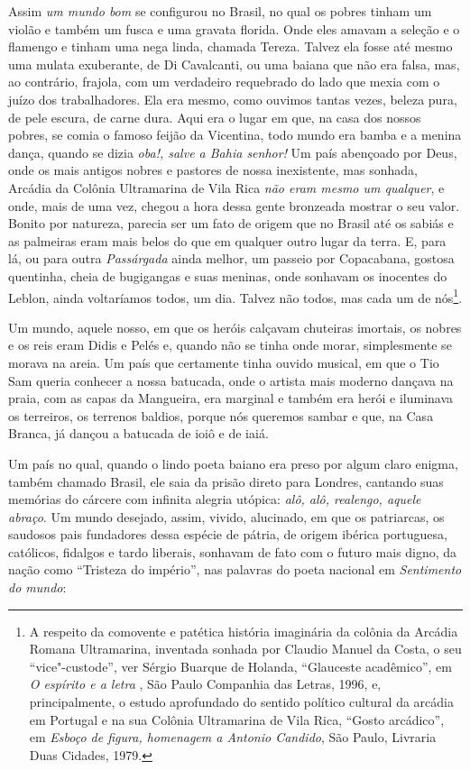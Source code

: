 Assim \emph{um mundo bom} se configurou no Brasil, no qual os pobres
tinham um violão e também um fusca e uma gravata florida. Onde eles
amavam a seleção e o flamengo e tinham uma nega linda, chamada Tereza.
Talvez ela fosse até mesmo uma mulata exuberante, de Di Cavalcanti, ou
uma baiana que não era falsa, mas, ao contrário, frajola, com um
verdadeiro requebrado do lado que mexia com o juízo dos trabalhadores.
Ela era mesmo, como ouvimos tantas vezes, beleza pura, de pele escura,
de carne dura. Aqui era o lugar em que, na casa dos nossos pobres, se
comia o famoso feijão da Vicentina, todo mundo era bamba e a menina
dança, quando se dizia \emph{oba!, salve a Bahia senhor!} Um país
abençoado por Deus, onde os mais antigos nobres e pastores de nossa
inexistente, mas sonhada, Arcádia da Colônia Ultramarina de Vila Rica
\emph{não eram mesmo um qualquer}, e onde, mais de uma vez, chegou a
hora dessa gente bronzeada mostrar o seu valor. Bonito por natureza,
parecia ser um fato de origem que no Brasil até os sabiás e as palmeiras
eram mais belos do que em qualquer outro lugar da terra. E, para lá, ou
para outra \emph{Passárgada} ainda melhor, um passeio por Copacabana,
gostosa quentinha, cheia de bugigangas e suas meninas, onde sonhavam os
inocentes do Leblon, ainda voltaríamos todos, um dia. Talvez não todos,
mas cada um de nós\footnote{A respeito da comovente e patética história
  imaginária da colônia da Arcádia Romana Ultramarina, inventada sonhada
  por Claudio Manuel da Costa, o seu ``vice"-custode'', ver Sérgio
  Buarque de Holanda, ``Glauceste acadêmico'', em \emph{O espírito e a
  letra }, São Paulo Companhia das Letras, 1996, e, principalmente, o
  estudo aprofundado do sentido político cultural da arcádia em Portugal
  e na sua Colônia Ultramarina de Vila Rica, ``Gosto arcádico'', em
  \emph{Esboço de figura, homenagem a Antonio Candido}, São Paulo,
  Livraria Duas Cidades, 1979.}.

Um mundo, aquele nosso, em que os heróis calçavam chuteiras imortais, os
nobres e os reis eram Didis e Pelés e, quando não se tinha onde morar,
simplesmente se morava na areia. Um país que certamente tinha ouvido
musical, em que o Tio Sam queria conhecer a nossa batucada, onde o
artista mais moderno dançava na praia, com as capas da Mangueira, era
marginal e também era herói e iluminava os terreiros, os terrenos
baldios, porque nós queremos sambar e que, na Casa Branca, já dançou a
batucada de ioiô e de iaiá.

Um país no qual, quando o lindo poeta baiano era preso por algum claro
enigma, também chamado Brasil, ele saia da prisão direto para Londres,
cantando suas memórias do cárcere com infinita alegria utópica:
\emph{alô, alô, realengo, aquele abraço}. Um mundo desejado, assim,
vivido, alucinado, em que os patriarcas, os saudosos pais fundadores
dessa espécie de pátria, de origem ibérica portuguesa, católicos,
fidalgos e tardo liberais, sonhavam de fato com o futuro mais digno, da
nação como ``Tristeza do império'', nas palavras do poeta nacional em
\emph{Sentimento do mundo}:


